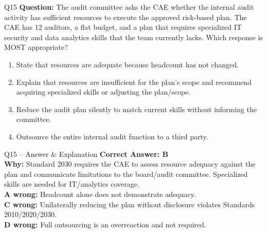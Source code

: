 \documentclass[aspectratio=169,10pt]{beamer}
\begin{document}
	\begin{frame}[t]{Q15}
		\small
		\textbf{Question:} The audit committee asks the CAE whether the internal audit activity has sufficient resources to execute the approved risk-based plan. The CAE has 12 auditors, a flat budget, and a plan that requires specialized IT security and data analytics skills that the team currently lacks. Which response is MOST appropriate?
		\begin{enumerate}[label=\Alph*.,itemsep=1pt,topsep=2pt]
			\item State that resources are adequate because headcount has not changed.
			\item Explain that resources are insufficient for the plan's scope and recommend acquiring specialized skills or adjusting the plan/scope.
			\item Reduce the audit plan silently to match current skills without informing the committee.
			\item Outsource the entire internal audit function to a third party.
		\end{enumerate}
	\end{frame}
	
	\begin{frame}[t]{Q15 -- Answer \& Explanation}
		\small
		\textbf{Correct Answer: B} \\[4pt]
		\textbf{Why:} Standard 2030 requires the CAE to assess resource adequacy against the plan and communicate limitations to the board/audit committee. Specialized skills are needed for IT/analytics coverage. \\[4pt]
		\textbf{A wrong:} Headcount alone does not demonstrate adequacy. \\[2pt]
		\textbf{C wrong:} Unilaterally reducing the plan without disclosure violates Standards 2010/2020/2030. \\[2pt]
		\textbf{D wrong:} Full outsourcing is an overreaction and not required.
	\end{frame}
	
\end{document}
